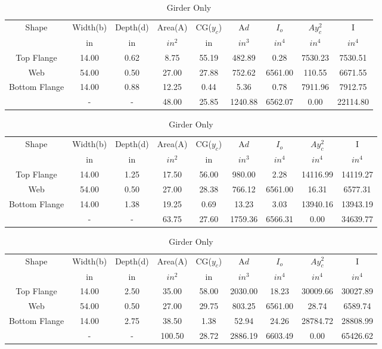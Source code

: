 \documentclass[11pt]{book}
\begin{document}
\begin{table}[H]
\centering
\caption{Girder Only}\begin{tabular}{|c|c|c|c|c|c|c|c|c|}
\hline
Shape &Width(b)     &Depth(d)  &Area(A)   &CG($y_c$)    &A$d$     &$I_o$      &$Ay_c^2$ &I      \\
      &in           &in        &$in^2$    &in           &$in^3$     &$in^4$   &$in^4$   &$in^4$  \\
\hline
Top Flange  &14.00 &0.62 &8.75 &55.19 &482.89 &0.28 &7530.23 &7530.51\\ \hline
Web  &54.00 &0.50 &27.00 &27.88 &752.62 &6561.00 &110.55 &6671.55\\ \hline
Bottom Flange  &14.00 &0.88 &12.25 &0.44 &5.36 &0.78 &7911.96 &7912.75\\ \hline
  &- &- &48.00 &25.85 &1240.88 &6562.07 &0.00 &22114.80\\ \hline
\end{tabular}
\end{table}
\begin{table}[H]
\centering
\caption{Girder Only}\begin{tabular}{|c|c|c|c|c|c|c|c|c|}
\hline
Shape &Width(b)     &Depth(d)  &Area(A)   &CG($y_c$)    &A$d$     &$I_o$      &$Ay_c^2$ &I      \\
      &in           &in        &$in^2$    &in           &$in^3$     &$in^4$   &$in^4$   &$in^4$  \\
\hline
Top Flange  &14.00 &1.25 &17.50 &56.00 &980.00 &2.28 &14116.99 &14119.27\\ \hline
Web  &54.00 &0.50 &27.00 &28.38 &766.12 &6561.00 &16.31 &6577.31\\ \hline
Bottom Flange  &14.00 &1.38 &19.25 &0.69 &13.23 &3.03 &13940.16 &13943.19\\ \hline
  &- &- &63.75 &27.60 &1759.36 &6566.31 &0.00 &34639.77\\ \hline
\end{tabular}
\end{table}
\begin{table}[H]
\centering
\caption{Girder Only}\begin{tabular}{|c|c|c|c|c|c|c|c|c|}
\hline
Shape &Width(b)     &Depth(d)  &Area(A)   &CG($y_c$)    &A$d$     &$I_o$      &$Ay_c^2$ &I      \\
      &in           &in        &$in^2$    &in           &$in^3$     &$in^4$   &$in^4$   &$in^4$  \\
\hline
Top Flange  &14.00 &2.50 &35.00 &58.00 &2030.00 &18.23 &30009.66 &30027.89\\ \hline
Web  &54.00 &0.50 &27.00 &29.75 &803.25 &6561.00 &28.74 &6589.74\\ \hline
Bottom Flange  &14.00 &2.75 &38.50 &1.38 &52.94 &24.26 &28784.72 &28808.99\\ \hline
  &- &- &100.50 &28.72 &2886.19 &6603.49 &0.00 &65426.62\\ \hline
\end{tabular}
\end{table}
\end{document}
